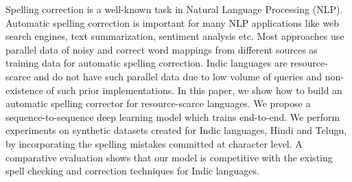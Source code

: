 Spelling correction is a well-known task in Natural Language Processing (NLP). Automatic spelling correction is important for many NLP applications like web search engines, text summarization, sentiment analysis etc. Most approaches use parallel data of noisy and correct word mappings from different sources as training data for automatic spelling correction. Indic languages are resource-scarce and do not have such parallel data due to low volume of queries and non-existence of such prior implementations. In this paper, we show how to build an automatic spelling corrector for resource-scarce languages. We propose a sequence-to-sequence deep learning model which trains end-to-end. We perform experiments on synthetic datasets created for Indic languages, Hindi and Telugu, by incorporating the spelling mistakes committed at character level. A comparative evaluation shows that our model is competitive with the existing spell checking and correction techniques for Indic languages.
